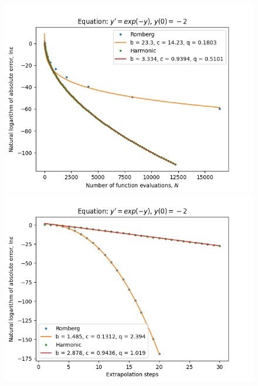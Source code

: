 \begin{figure}[H]
\centering
\begin{minipage}{0.45\textwidth}
\centering
\includegraphics[scale=0.45]{../results/emr_plots/ln_em2_hp_trend.png}
\end{minipage}
\begin{minipage}{0.45\textwidth}
\centering
\includegraphics[scale=0.45]{../results/emr_plots/ln_em2_hp_steps.png}
\end{minipage}
\end{figure}

